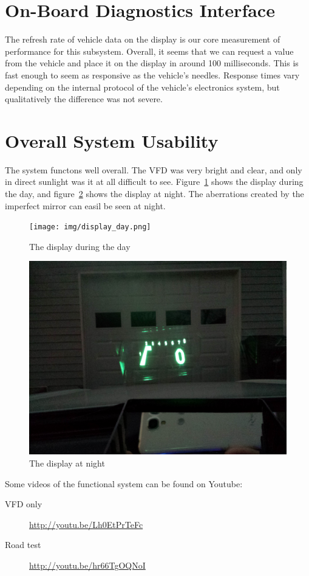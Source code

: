 \section{On-Board Diagnostics Interface}

The refresh rate of vehicle data on the display is our core measurement of
performance for this subsystem. Overall, it seems that we can request a value
from the vehicle and place it on the display in around 100 milliseconds. This
is fast enough to seem as responsive as the vehicle's needles. Response times
vary depending on the internal protocol of the vehicle's electronics system, but
qualitatively the difference was not severe.

\section{Overall System Usability}

The system functons well overall. The VFD was very bright and clear, and only
in direct sunlight was it at all difficult to see. Figure~\ref{fig:display-day}
shows the display during the day, and figure~\ref{fig:display-night} shows
the display at night.  The aberrations created by the imperfect mirror can 
easil be seen at night.

\begin{figure}[h]
\texttt{[image: img/display\_day.png]}
\caption{The display during the day}
\label{fig:display-day}
\end{figure}

\begin{figure}[h]
\includegraphics[width=\textwidth]{img/display_night.jpg}
\caption{The display at night}
\label{fig:display-night}
\end{figure}

Some videos of the functional system can be found on Youtube:

\begin{description}
\item[VFD only]\url{http://youtu.be/Lh0EtPrTeFc}
\item[Road test] \url{http://youtu.be/hr66TgOQNoI}
\end{description}
